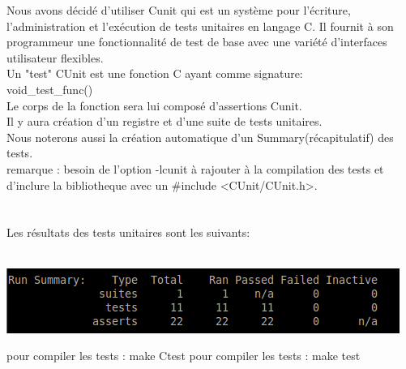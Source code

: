 \documentclass[a4]{article}
\begin{document}
Nous avons décidé d'utiliser Cunit qui est un système pour l'écriture, l'administration et l'exécution de tests unitaires
en langage C. Il fournit à son programmeur une fonctionnalité de test de base avec une variété d'interfaces utilisateur flexibles.\\
Un "test"  CUnit est une fonction C ayant comme signature:\\
void\_test\_func()\\
Le corps de la fonction sera lui composé d'assertions Cunit.\\
Il y aura création d'un registre et d'une suite de tests unitaires.\\
Nous noterons aussi la création automatique d'un Summary(récapitulatif) des tests.\\
remarque : besoin de l'option -lcunit à rajouter à la compilation des tests et d'inclure la bibliotheque avec un
\#include <CUnit/CUnit.h>.\\ \\ \\ 

  
Les résultats des tests unitaires sont les suivants:\\ \\ 
		 \begin{center}\includegraphics[scale=0.5]{Capture.png}\end{center}
	pour compiler les tests : make Ctest
	pour compiler les tests : make test
\end{document}
